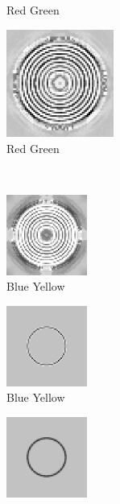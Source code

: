 \documentclass[journal,onecolumn]{IEEEtran}
\begin{document}
{\begin{figure}[H]
\begin{subfigure}[b]{0.25\textwidth}
            \caption{Red Green}
            \label{fig:test-circle-a2-dwt-rg-mask}
    \end{subfigure}%
    \begin{subfigure}[b]{0.25\textwidth}
            \centering
            \includegraphics[width=100pt, frame]{test-circle-a2-dwt-rg}
            \caption{Red Green}
            \label{fig:test-circle-a2-dwt-rg}
    \end{subfigure}\\
    \begin{subfigure}[b]{0.25\textwidth}
            \centering
            \includegraphics[width=100px, frame]{test-circle-a1-dwt-by}
            \caption{Blue Yellow}
            \label{fig:test-circle-a1-dwt-by}
    \end{subfigure}%
    \begin{subfigure}[b]{0.25\textwidth}
            \centering
            \includegraphics[width=100px, frame]{test-circle-a1-dwt-by-mask}
            \caption{Blue Yellow}
            \label{fig:test-circle-a1-dwt-by-mask}
    \end{subfigure}%
    \begin{subfigure}[b]{0.25\textwidth}
            \centering
            \includegraphics[width=100px, frame]{test-circle-a2-dwt-by-mask}

\end{subfigure}
\end{figure}}
\end{document}
